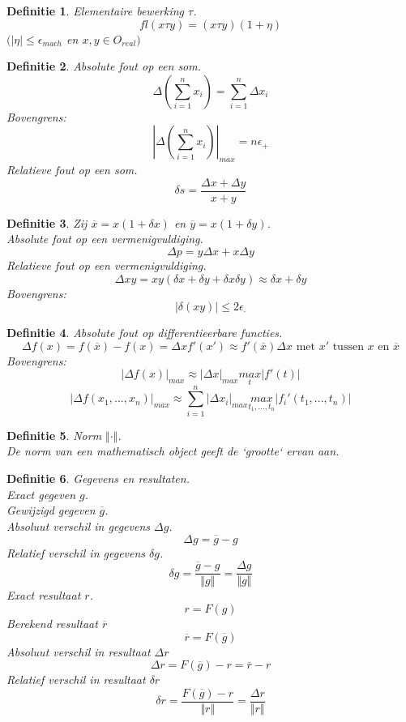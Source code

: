 \documentclass[12pt,a4paper]{article}
\newtheorem{defi}{Definitie}
\begin{document}
\begin{defi}
Elementaire bewerking $\tau$.
\[
fl(x \tau y) = (x \tau y)(1 + \eta)
\]
$(|\eta| \le \epsilon_{mach}$ en $x,y \in O_{real})$
\end{defi}
\begin{defi}
Absolute fout op een som.
\[
\Delta\left(\sum_{i=1}^nx_i\right) = \sum_{i=1}^n\Delta x_i
\]
Bovengrens:
\[
\left|\Delta\left(\sum_{i=1}^nx_i\right)\right|_{max} = n\epsilon_{+}
\]
Relatieve fout op een som.
\[
\delta s = \frac{\Delta x + \Delta y}{x+y}
\]
\end{defi}
\begin{defi}
Zij $\overline{x} = x(1+\delta x)$ en $\overline{y} = x(1+\delta y)$.\\
Absolute fout op een vermenigvuldiging.
\[
\Delta p = y\Delta x + x\Delta y
\]
Relatieve fout op een vermenigvuldiging. 
\[
\Delta xy = xy(\delta x + \delta y + \delta x \delta y) \approx \delta x + \delta y
\]
Bovengrens:
\[
|\delta(xy)| \le 2\epsilon_{\cdot}
\]
\end{defi}
\begin{defi}
Absolute fout op differentieerbare functies.
\[
\Delta f(x) = f(\overline{x}) - f(x) = \Delta x f'(x') \approx f'(\overline{x})\Delta x\text{ met } x' \text{ tussen } x \text{ en }\overline{x}
\]
Bovengrens:
\[
|\Delta f(x)|_{max} \approx |\Delta x|_{max} \underset{t}{max}|f'(t)|
\]
\[
|\Delta f(x_1,...,x_n)|_{max} \approx \sum_{i=1}^n|\Delta x_i|_{max} \underset{t_1,...,t_n}{max}|f_i'(t_1,...,t_n)|
\]
\end{defi}
\begin{defi}
Norm $\Vert \cdot \Vert$.\\
De norm van een mathematisch object geeft de `grootte` ervan aan.
\end{defi}
\begin{defi} Gegevens en resultaten.\\
Exact gegeven $g$.\\
Gewijzigd gegeven $\overline{g}$.\\
Absoluut verschil in gegevens $\Delta g$.
\[
\Delta g = \overline{g} - g
\]
Relatief verschil in gegevens $\delta g$.
\[
\delta g
= \frac{\overline{g} - g}{\Vert g \Vert}
= \frac{\Delta g}{\Vert g \Vert}
\]
Exact resultaat $r$.
\[
r = F(g)
\]
Berekend resultaat $\overline{r}$
\[
\overline{r} = F(\overline{g})
\]
Absoluut verschil in resultaat $\Delta r$
\[
\Delta r
= F(\overline{g}) - r
= \overline{r} - r
\]
Relatief verschil in resultaat $\delta r$
\[
\delta r
= \frac{F(\overline{g}) - r}{\Vert r \Vert}
= \frac{\Delta r}{\Vert r \Vert}
\]
\end{defi}
\end{document}
